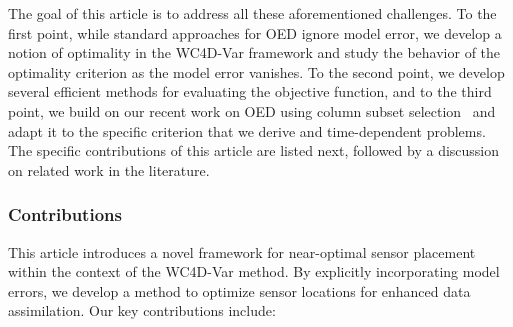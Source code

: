 \documentclass{aims} %
\theoremstyle{definition}
\begin{document}
The goal of this article is to address all these aforementioned challenges. To the first point, while standard approaches for OED ignore model error, we develop a notion of optimality in the WC4D-Var framework and study the behavior of the optimality criterion as the model error vanishes. To the second point, we develop several efficient methods for evaluating the objective function, and to the third point,  we build on our recent work on OED using column subset selection~\cite{eswar2024bayesian} and adapt it to the specific criterion that we derive and time-dependent problems. The specific contributions of this article are listed next, followed by a discussion on related work in the literature. 



\subsubsection*{Contributions}

This article introduces a novel framework for near-optimal sensor placement within the context of the WC4D-Var method. By explicitly incorporating model errors, we develop a method to optimize sensor locations for enhanced data assimilation. Our key contributions include:
\end{document}
